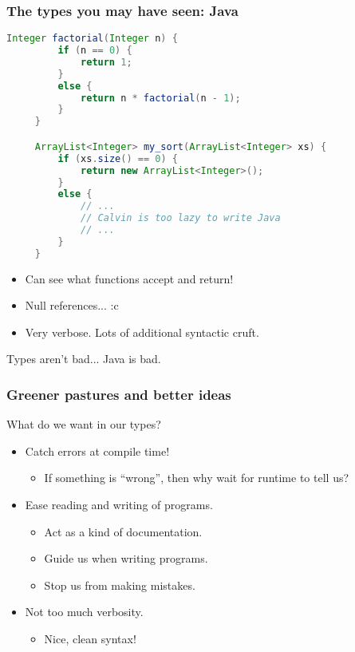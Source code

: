 \documentclass{beamer}
\begin{document}
\begin{frame}[fragile]
  \frametitle{The types you may have seen: Java}

  \begin{lstlisting}[frame=single, language=Java, breaklines=true, basicstyle=\ttfamily\tiny]
     Integer factorial(Integer n) {
         if (n == 0) {
             return 1;
         }
         else {
             return n * factorial(n - 1);
         }
     }

     ArrayList<Integer> my_sort(ArrayList<Integer> xs) {
         if (xs.size() == 0) {
             return new ArrayList<Integer>();
         }
         else {
             // ...
             // Calvin is too lazy to write Java
             // ...
         }
     }
   \end{lstlisting}

   \begin{itemize}
   \pause
   \item Can see what functions accept and return!
   \pause
   \item Null references... :c
   \pause
   \item Very verbose. Lots of additional syntactic cruft.
   \end{itemize}

   \pause

   Types aren't bad... \pause Java is bad.
\end{frame}

\begin{frame}
  \frametitle{Greener pastures and better ideas}

  What do we want in our types?

  \begin{itemize}
    \pause
  \item Catch errors at compile time!
    \begin{itemize}
    \item If something is ``wrong'', then why wait for runtime to tell us?
    \end{itemize}
    \pause
  \item Ease reading and writing of programs.
    \begin{itemize}
    \item Act as a kind of documentation.
    \item Guide us when writing programs.
    \item Stop us from making mistakes.
    \end{itemize}
    \pause
  \item Not too much verbosity.
    \begin{itemize}
    \item Nice, clean syntax!
    \end{itemize}
  \end{itemize}   
\end{frame}
\end{document}
